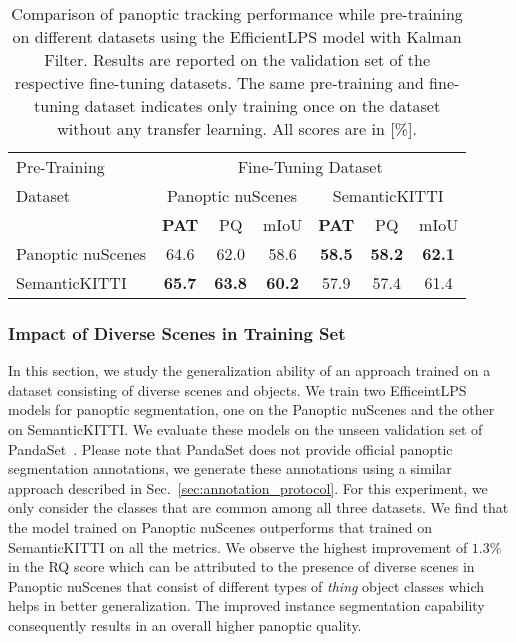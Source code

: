 \documentclass[letterpaper, 10 pt, journal, twoside]{IEEEtran}
\newcommand{\secref}[1]{Sec.~\ref{#1}}
\newcommand{\newmet}{PAT}
\begin{document}
\begin{table}
\centering
\caption{Comparison of panoptic tracking performance while pre-training on different datasets using the EfficientLPS model with Kalman Filter. Results are reported on the validation set of the respective fine-tuning datasets. The same pre-training and fine-tuning dataset indicates only training once on the dataset without any transfer learning. All scores are in [\%].}
\label{tab:pretrainingNew}
\footnotesize
\begin{tabular}{l|ccc|ccc}
\toprule
Pre-Training & \multicolumn{6}{c}{Fine-Tuning Dataset} \\
\cmidrule{2-7}
Dataset &  \multicolumn{3}{c|}{Panoptic nuScenes} & \multicolumn{3}{c}{SemanticKITTI} \\
\cmidrule{2-7}
& {\textbf{\newmet}} & PQ & mIoU & {\textbf{\newmet}} & PQ & mIoU  \\
\midrule
Panoptic nuScenes & 64.6 & 62.0  & 58.6 & \textbf{58.5} & \textbf{58.2}  & \textbf{62.1} \\
SemanticKITTI & \textbf{65.7} & \textbf{63.8} & \textbf{60.2} & 57.9 & 57.4  & 61.4 \\
\bottomrule
\end{tabular}
\vspace{-0.2cm}
\end{table}

\subsubsection{Impact of Diverse Scenes in Training Set}
\label{sec:generalize}
In this section, we study the generalization ability of an approach trained on a dataset consisting of diverse scenes and objects. We train two EfficeintLPS models for panoptic segmentation, one on the Panoptic nuScenes and the other on SemanticKITTI. We evaluate these models on the unseen validation set of PandaSet~\cite{pandaset}. Please note that PandaSet does not provide official panoptic segmentation annotations, we generate these annotations using a similar approach described in \secref{sec:annotation_protocol}. For this experiment, we only consider the classes that are common among all three datasets. We find that the model trained on Panoptic nuScenes outperforms that trained on SemanticKITTI on all the metrics. We observe the highest improvement of $1.3\%$ in the RQ score which can be attributed to the presence of diverse scenes in Panoptic nuScenes that consist of different types of \emph{thing} object classes which helps in better generalization. The improved instance segmentation capability consequently results in an overall higher panoptic quality.
\end{document}
